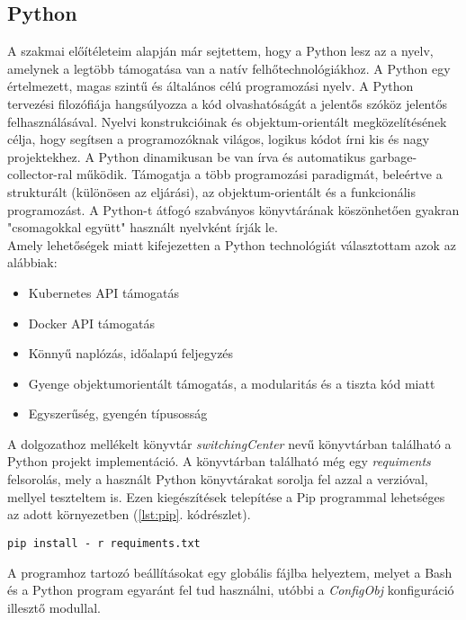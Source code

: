 \subsection{Python}
A szakmai előítéleteim alapján már sejtettem, hogy a Python lesz az a nyelv, amelynek a legtöbb támogatása van a natív felhőtechnológiákhoz. A Python egy értelmezett, magas szintű és általános célú programozási nyelv. A Python tervezési filozófiája hangsúlyozza a kód olvashatóságát a jelentős szóköz jelentős felhasználásával. Nyelvi konstrukcióinak és objektum-orientált megközelítésének célja, hogy segítsen a programozóknak világos, logikus kódot írni kis és nagy projektekhez. A Python dinamikusan be van írva és automatikus garbage-collector-ral működik. Támogatja a több programozási paradigmát, beleértve a strukturált (különösen az eljárási), az objektum-orientált és a funkcionális programozást. A Python-t átfogó szabványos könyvtárának köszönhetően gyakran "csomagokkal együtt" használt nyelvként írják le. \cite{pwiki} \\

\noindent
Amely lehetőségek miatt kifejezetten a Python technológiát választottam azok az alábbiak:
\begin{itemize}
	\item Kubernetes API támogatás
	\item Docker API támogatás
	\item Könnyű naplózás, időalapú feljegyzés
	\item Gyenge objektumorientált támogatás, a modularitás és a tiszta kód miatt
	\item Egyszerűség, gyengén típusosság
\end{itemize}

\noindent
A dolgozathoz mellékelt könyvtár \emph{switchingCenter} nevű könyvtárban található a Python projekt implementáció. A könyvtárban található még egy \emph{requiments} felsorolás, mely a használt Python könyvtárakat sorolja fel azzal a verzióval, mellyel teszteltem is. Ezen kiegészítések telepítése a Pip programmal lehetséges az adott környezetben (\ref{lst:pip}. kódrészlet).

\begin{lstlisting}[caption={Python könyvtárak telepítése}, label={lst:pip}]
pip install - r requiments.txt
\end{lstlisting}

\noindent
A programhoz tartozó beállításokat egy globális fájlba helyeztem, melyet a Bash és a Python program egyaránt fel tud használni, utóbbi a \emph{ConfigObj} konfiguráció illesztő modullal.

